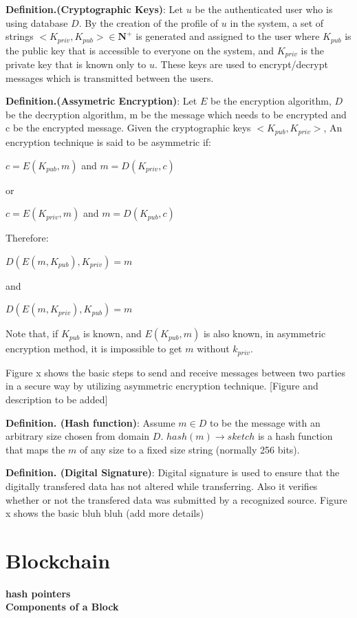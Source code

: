 \textbf{Definition.(Cryptographic Keys)}: Let $u$ be the authenticated user who is using database $D$. By the creation of the profile of $u$ in the system, a set of strings $<K_{priv},K_{pub}> \in \mathbf{N}^+$ is generated and assigned to the user where $K_{pub}$ is the public key that is accessible to everyone on the system, and $K_{priv}$ is the private key that is known only to $u$. These keys are used to encrypt/decrypt messages which is transmitted between the users.


\textbf{Definition.(Assymetric Encryption)}: Let $E$ be the encryption algorithm, $D$ be the decryption algorithm, m be the message which needs to be encrypted and c be the encrypted message. Given the cryptographic keys $<K_{pub}, K_{priv}>$, An encryption technique is said to be asymmetric if:

\begin{center}
	$c = E(K_{pub},m)$ and  $m = D(K_{priv},c)$
\end{center}
or
\begin{center}
	$c = E(K_{priv},m)$ and  $m = D(K_{pub},c)$
\end{center}
Therefore:
\begin{center}
	$D(E(m,K_{pub}),K_{priv}) = m$ 
\end{center}
and
\begin{center}
	$D(E(m,K_{priv}),K_{pub}) = m$
\end{center}
Note that, if $K_{pub}$ is known, and $E(K_{pub},m)$ is also known, in asymmetric encryption method, it is impossible to get $m$ without $k_{priv}$.

Figure x shows the basic steps to send and receive messages between two parties in a secure way by utilizing asymmetric encryption technique. [Figure and description to be added]

\textbf{Definition. (Hash function)}: Assume $m \in D$ to be the message with an arbitrary size chosen from domain $D$. $hash(m)\rightarrow sketch$ 
is a hash function that maps the $m$ of any size to a fixed size string (normally 256 bits).


\textbf{Definition. (Digital Signature)}: Digital signature is used to ensure that the digitally transfered data has not altered while transferring. Also it verifies whether or not the transfered data was submitted by a recognized source. Figure x shows the basic bluh bluh (add more details)
\section{Blockchain}
\textbf{hash pointers}\\
\textbf{Components of a Block}\\
